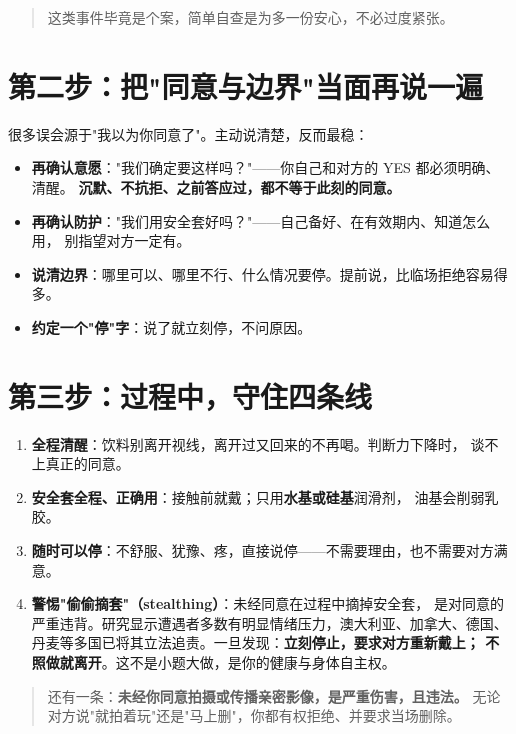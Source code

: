 \begin{quote}
这类事件毕竟是个案，简单自查是为多一份安心，不必过度紧张。
\end{quote}

\section{第二步：把"同意与边界"当面再说一遍}

很多误会源于"我以为你同意了"。主动说清楚，反而最稳：

\begin{itemize}[leftmargin=2em]
  \item \textbf{再确认意愿}："我们确定要这样吗？"——你自己和对方的 YES 都必须明确、清醒。
        \textbf{沉默、不抗拒、之前答应过，都不等于此刻的同意。}
  \item \textbf{再确认防护}："我们用安全套好吗？"——自己备好、在有效期内、知道怎么用，
        别指望对方一定有。
  \item \textbf{说清边界}：哪里可以、哪里不行、什么情况要停。提前说，比临场拒绝容易得多。
  \item \textbf{约定一个"停"字}：说了就立刻停，不问原因。
\end{itemize}

\section{第三步：过程中，守住四条线}

\begin{enumerate}[leftmargin=2em,itemsep=0.3em]
  \item \textbf{全程清醒}：饮料别离开视线，离开过又回来的不再喝。判断力下降时，
        谈不上真正的同意。
  \item \textbf{安全套全程、正确用}：接触前就戴；只用\textbf{水基或硅基}润滑剂，
        油基会削弱乳胶。
  \item \textbf{随时可以停}：不舒服、犹豫、疼，直接说停——不需要理由，也不需要对方满意。
  \item \textbf{警惕"偷偷摘套"（stealthing）}：未经同意在过程中摘掉安全套，
        是对同意的严重违背。研究显示遭遇者多数有明显情绪压力，澳大利亚、加拿大、德国、
        丹麦等多国已将其立法追责。一旦发现：\textbf{立刻停止，要求对方重新戴上；
        不照做就离开}。这不是小题大做，是你的健康与身体自主权。
\end{enumerate}

\begin{quote}
还有一条：\textbf{未经你同意拍摄或传播亲密影像，是严重伤害，且违法。}
无论对方说"就拍着玩"还是"马上删"，你都有权拒绝、并要求当场删除。
\end{quote}

